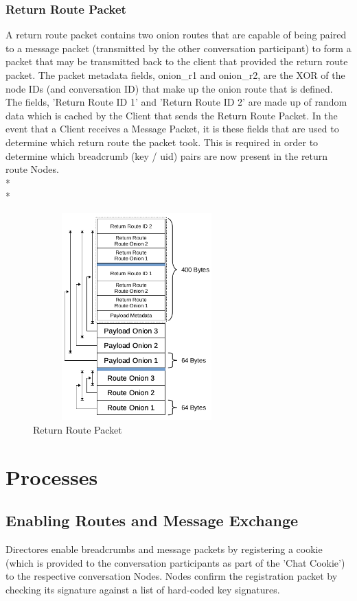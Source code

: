 \documentclass{article}
\begin{document}
\subsubsection{Return Route Packet}
A return route packet contains two onion routes that are capable of being paired to a message packet (transmitted by the other conversation participant) to form a packet that may be transmitted back to the client that provided the
return route packet. The packet metadata fields, onion\_r1 and onion\_r2, are the XOR of the node IDs (and conversation ID) that make up the onion route that is defined. The fields, 'Return Route ID 1' and 'Return Route ID 2' are made up of random data which is cached by the Client that sends the Return Route Packet. In the event that a Client receives a Message Packet, it is these fields that are used to determine which return route the packet took. This is required in order to determine which breadcrumb (key / uid) pairs are now present in the return route Nodes.\\*\\*
\begin{figure}[h]
	\centering
  	\includegraphics[width=8cm,height=8cm,keepaspectratio]{img/ReturnRoutePacketStructure.png}
	\caption{Return Route Packet}
\end{figure}
\newpage

\section{Processes}
\subsection{Enabling Routes and Message Exchange}
Directores enable breadcrumbs and message packets by registering a cookie (which is provided to the conversation participants as part of the 'Chat Cookie') to the respective conversation Nodes. Nodes confirm the registration packet by checking its signature against a list of hard-coded key signatures.
\end{document}
